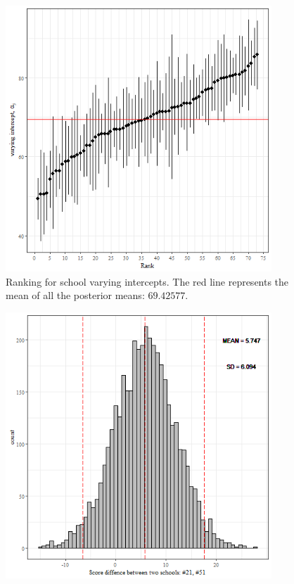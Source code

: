 \begin{figure}[H]
	\centering
	\includegraphics[width=10cm,height=10cm,keepaspectratio]{./graphics/ranking.png}
	\caption{Ranking for school varying intercepts. The red line represents the mean of all the posterior means: $69.42577$.}
	\label{fig:ranking}
\end{figure}

\begin{figure}[H]
	\centering
	\includegraphics[width=10cm,height=10cm,keepaspectratio]{graphics/differences.png}
	\caption{}
	\label{fig:differences}
\end{figure}


